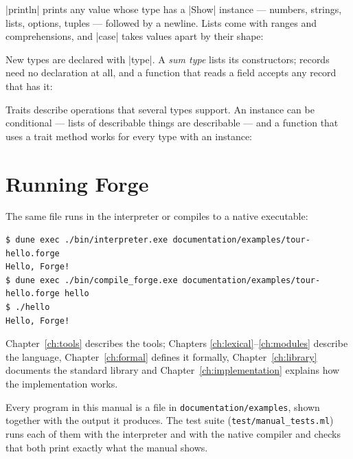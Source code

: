 
\fc|println| prints any value whose type has a \fc|Show| instance --- numbers,
strings, lists, options, tuples --- followed by a newline. Lists come with
ranges and comprehensions, and \fc|case| takes values apart by their shape:


New types are declared with \fc|type|. A \emph{sum type} lists its
constructors; records need no declaration at all, and a function that reads a
field accepts any record that has it:


Traits describe operations that several types support. An instance can be
conditional --- lists of describable things are describable --- and a
function that uses a trait method works for every type with an instance:


\section{Running Forge}

The same file runs in the interpreter or compiles to a native executable:

\begin{shellpanel}
\begin{lstlisting}
$ dune exec ./bin/interpreter.exe documentation/examples/tour-hello.forge
Hello, Forge!
$ dune exec ./bin/compile_forge.exe documentation/examples/tour-hello.forge hello
$ ./hello
Hello, Forge!
\end{lstlisting}
\end{shellpanel}

Chapter~\ref{ch:tools} describes the tools; Chapters
\ref{ch:lexical}--\ref{ch:modules} describe the language, Chapter~\ref{ch:formal}
defines it formally, Chapter~\ref{ch:library} documents the standard library and
Chapter~\ref{ch:implementation} explains how the implementation works.

\begin{notebox}
Every program in this manual is a file in \texttt{documentation/examples},
shown together with the output it produces. The test suite
(\texttt{test/manual\_tests.ml}) runs each of them with the interpreter and
with the native compiler and checks that both print exactly what the manual
shows.
\end{notebox}
